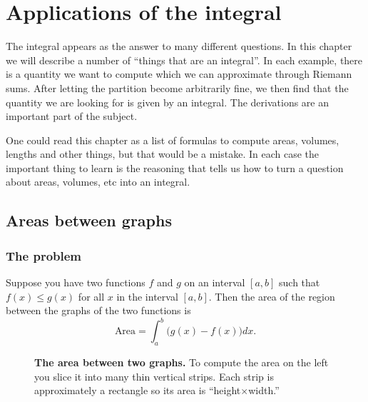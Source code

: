 



\chapter{Applications of the integral}
The integral appears as the answer to many different questions.  In this chapter
we will describe a number of ``things that are an integral''.  In each example,
there is a quantity we want to compute which we can approximate through
Riemann sums.  After letting the partition become arbitrarily fine, we then find
that the quantity we are looking for is given by an integral.  The derivations
are an important part of the subject.

One could read this chapter as a list of formulas to compute areas, volumes,
lengths and other things, but that would be a mistake.  In each case the
important thing to learn is the reasoning that tells us how to turn a question
about areas, volumes, etc into an integral.

\section{Areas between graphs} %
\subsection{The problem} %
Suppose you have two functions $f$ and $g$ on an interval $[a,b]$ such that
$f(x)\leq g(x)$
for all $x$ in the interval $[a,b]$.  Then the area of the region between the
graphs of the two functions is
\begin{equation}
  \label{eq:area-between-graphs}
  \textrm{Area} = \int_a^b \bigl(g(x) - f(x) \bigr) dx.
\end{equation}
\begin{figure}[h]
  \leftline{ 
     {\sffamily\footnotesize%
       } }
  
  \caption{\textbf{The area between two graphs. } %
    To compute the area on the left you slice it into many thin vertical strips.
    Each strip is approximately a rectangle so its area is
    ``height$\times$width.''  }

\end{figure}
